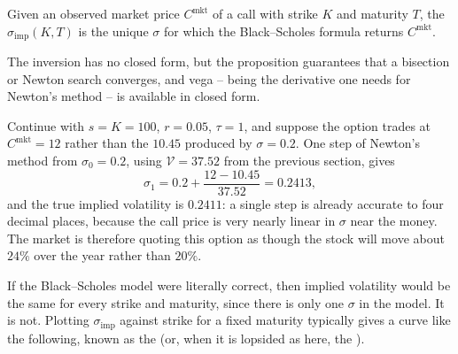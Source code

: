 \documentclass[a4paper]{scrartcl}
\begin{document}
\begin{definition}
	Given an observed market price $C^{\mathrm{mkt}}$ of a call with strike $K$ and maturity $T$, the  $\sigma_{\mathrm{imp}}(K,T)$ is the unique $\sigma$ for which the Black--Scholes formula returns $C^{\mathrm{mkt}}$.
\end{definition}

The inversion has no closed form, but the proposition guarantees that a bisection or Newton search converges, and vega -- being the derivative one needs for Newton's method -- is available in closed form.

\begin{example}
	Continue with $s = K = 100$, $r = 0.05$, $\tau = 1$, and suppose the option trades at $C^{\mathrm{mkt}} = 12$ rather than the $10.45$ produced by $\sigma = 0.2$. One step of Newton's method from $\sigma_0 = 0.2$, using $\mathcal{V} = 37.52$ from the previous section, gives
	$$
	\sigma_1 = 0.2 + \frac{12 - 10.45}{37.52} = 0.2413,
	$$
	and the true implied volatility is $0.2411$: a single step is already accurate to four decimal places, because the call price is very nearly linear in $\sigma$ near the money. The market is therefore quoting this option as though the stock will move about $24\%$ over the year rather than $20\%$.
\end{example}

If the Black--Scholes model were literally correct, then implied volatility would be the same for every strike and maturity, since there is only one $\sigma$ in the model. It is not. Plotting $\sigma_{\mathrm{imp}}$ against strike for a fixed maturity typically gives a curve like the following, known as the  (or, when it is lopsided as here, the ).
\end{document}
